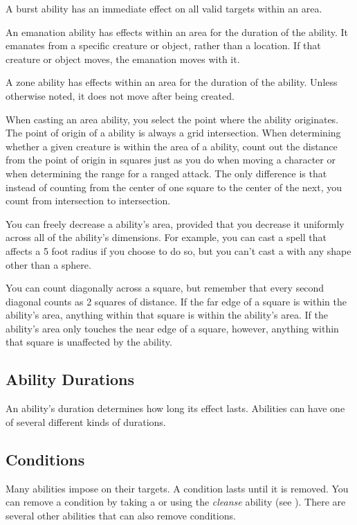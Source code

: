              A burst ability has an immediate effect on all valid targets within an area.

             An emanation ability has effects within an area for the duration of the ability.
            It emanates from a specific creature or object, rather than a location.
            If that creature or object moves, the emanation moves with it.

             A zone ability has effects within an area for the duration of the ability.
            Unless otherwise noted, it does not move after being created.


        When casting an area ability, you select the point where the ability originates.
        The point of origin of a ability is always a grid intersection.
        When determining whether a given creature is within the area of a ability, count out the distance from the point of origin in squares just as you do when moving a character or when determining the range for a ranged attack.
        The only difference is that instead of counting from the center of one square to the center of the next, you count from intersection to intersection.

        You can freely decrease a ability's area, provided that you decrease it uniformly across all of the ability's dimensions.
        For example, you can cast a  spell that affects a 5 foot radius if you choose to do so, but you can't cast a  with any shape other than a sphere.

        You can count diagonally across a square, but remember that every second diagonal counts as 2 squares of distance.
        If the far edge of a square is within the ability's area, anything within that square is within the ability's area.
        If the ability's area only touches the near edge of a square, however, anything within that square is unaffected by the ability.

    \subsection{Ability Durations}

        An ability's duration determines how long its effect lasts.
        Abilities can have one of several different kinds of durations.

        \subsection{Conditions}\label{Conditions}
            Many abilities impose  on their targets.
            A condition lasts until it is removed.
            You can remove a condition by taking a  or using the \textit{cleanse} ability (see ).
            There are several other abilities that can also remove conditions.

